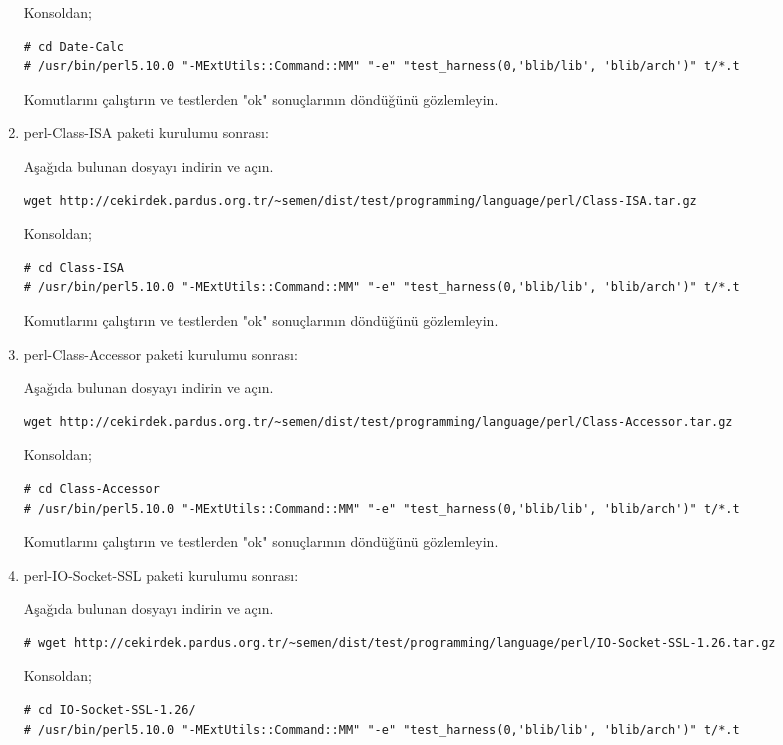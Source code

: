 \documentclass[a4paper,10pt]{article}
\begin{document}
\begin{enumerate}
Konsoldan;
\begin{verbatim}
# cd Date-Calc
# /usr/bin/perl5.10.0 "-MExtUtils::Command::MM" "-e" "test_harness(0,'blib/lib', 'blib/arch')" t/*.t
\end{verbatim}

Komutlarını çalıştırın ve testlerden "ok" sonuçlarının döndüğünü gözlemleyin.

\item perl-Class-ISA paketi kurulumu sonrası:

Aşağıda bulunan dosyayı indirin ve açın.
\begin{verbatim}
wget http://cekirdek.pardus.org.tr/~semen/dist/test/programming/language/perl/Class-ISA.tar.gz
\end{verbatim}

Konsoldan;
\begin{verbatim}
# cd Class-ISA
# /usr/bin/perl5.10.0 "-MExtUtils::Command::MM" "-e" "test_harness(0,'blib/lib', 'blib/arch')" t/*.t
\end{verbatim}

Komutlarını çalıştırın ve testlerden "ok" sonuçlarının döndüğünü gözlemleyin.

\item perl-Class-Accessor paketi kurulumu sonrası:

Aşağıda bulunan dosyayı indirin ve açın.
\begin{verbatim}
wget http://cekirdek.pardus.org.tr/~semen/dist/test/programming/language/perl/Class-Accessor.tar.gz
\end{verbatim}

Konsoldan;
\begin{verbatim}
# cd Class-Accessor
# /usr/bin/perl5.10.0 "-MExtUtils::Command::MM" "-e" "test_harness(0,'blib/lib', 'blib/arch')" t/*.t
\end{verbatim}

Komutlarını çalıştırın ve testlerden "ok" sonuçlarının döndüğünü gözlemleyin.


\item perl-IO-Socket-SSL paketi kurulumu sonrası:

Aşağıda bulunan dosyayı indirin ve açın.
\begin{verbatim}
# wget http://cekirdek.pardus.org.tr/~semen/dist/test/programming/language/perl/IO-Socket-SSL-1.26.tar.gz
\end{verbatim}

Konsoldan;
\begin{verbatim}
# cd IO-Socket-SSL-1.26/
# /usr/bin/perl5.10.0 "-MExtUtils::Command::MM" "-e" "test_harness(0,'blib/lib', 'blib/arch')" t/*.t
\end{verbatim}


\end{enumerate}
\end{document}
